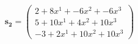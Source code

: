 \documentclass[preview]{standalone}
\begin{document}
\begin{align*}
\mathbf{s_2} = \begin{pmatrix}2 + 8x^{1} + -6x^{2} + -6x^{3} \\ 5 + 10x^{1} + 4x^{2} + 10x^{3} \\ -3 + 2x^{1} + 10x^{2} + 10x^{3}\end{pmatrix}
\end{align*}
\end{document}
